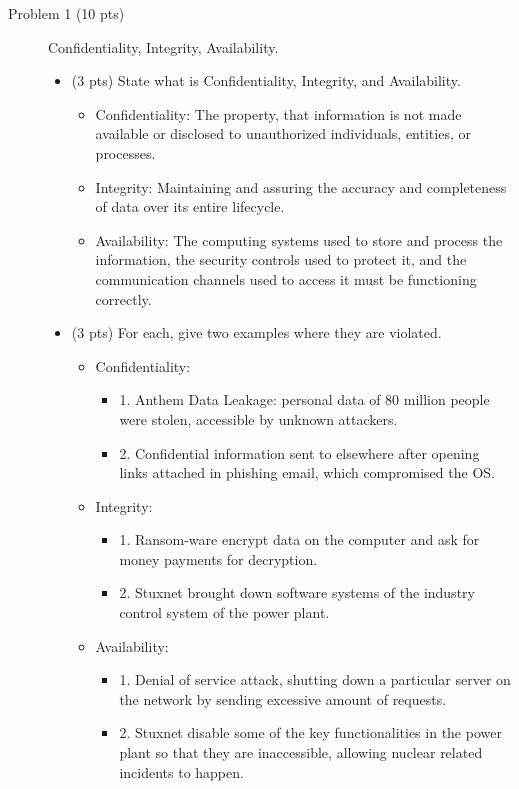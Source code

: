 \documentclass[11pt]{article}
\begin{document}
\begin{description}
 \item[Problem 1 (10 pts)] Confidentiality, Integrity, Availability.
\begin{itemize}
 \item  (3 pts)
State what is Confidentiality, Integrity, and Availability.
	\begin{itemize}
		\item
		Confidentiality: The property, that information is not made available or disclosed to unauthorized individuals, entities, or processes.
		\item
		Integrity: Maintaining and assuring the accuracy and completeness of data over its entire lifecycle.
		\item
		Availability:  The computing systems used to store and process the information, the security controls used to protect it, and the communication channels used to access it must be functioning correctly.
	\end{itemize}
 \item (3 pts)
For each, give two examples where they are violated.
	\begin{itemize}
		\item
		Confidentiality:
			\begin{itemize}
				\item
				1. Anthem Data Leakage: personal data of 80 million people were stolen, accessible by unknown attackers.
				\item
				2. Confidential information sent to elsewhere after opening links attached in phishing email, which compromised the OS.
			\end{itemize}
		\item
		Integrity:
			\begin{itemize}
				\item
				1. Ransom-ware encrypt data on the computer and ask for money payments for decryption.
				\item
				2. Stuxnet brought down software systems of the industry control system of the power plant.
			\end{itemize}
		\item
		Availability:
			\begin{itemize}
				\item
				1. Denial of service attack, shutting down a particular server on the network by sending excessive amount of requests.
				\item
				2. Stuxnet disable some of the key functionalities in the power plant so that they are inaccessible, allowing nuclear related incidents to happen.

\end{itemize}
\end{itemize}
\end{itemize}
\end{description}
\end{document}
